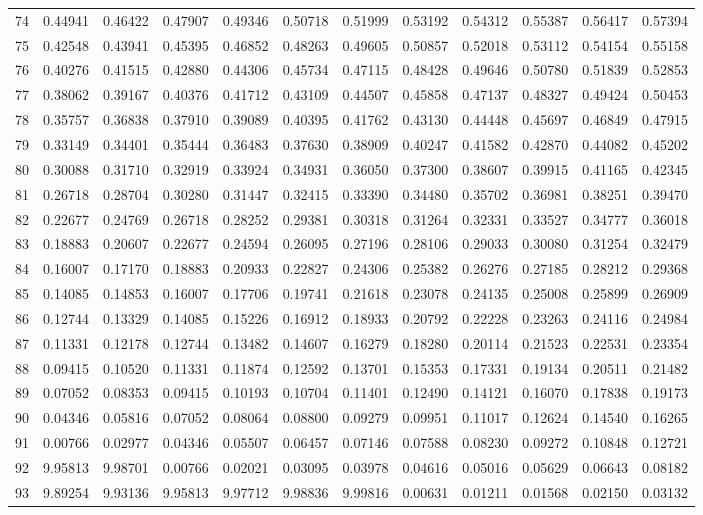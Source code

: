 \begin{center}
\begin{tabular}{|r|rrrrrrrrrrr|}
74&0.44941&0.46422&0.47907&0.49346&0.50718&0.51999&0.53192&0.54312&0.55387&0.56417&0.57394\\[5pt]
75&0.42548&0.43941&0.45395&0.46852&0.48263&0.49605&0.50857&0.52018&0.53112&0.54154&0.55158\\
76&0.40276&0.41515&0.42880&0.44306&0.45734&0.47115&0.48428&0.49646&0.50780&0.51839&0.52853\\
77&0.38062&0.39167&0.40376&0.41712&0.43109&0.44507&0.45858&0.47137&0.48327&0.49424&0.50453\\
78&0.35757&0.36838&0.37910&0.39089&0.40395&0.41762&0.43130&0.44448&0.45697&0.46849&0.47915\\
79&0.33149&0.34401&0.35444&0.36483&0.37630&0.38909&0.40247&0.41582&0.42870&0.44082&0.45202\\[5pt]
80&0.30088&0.31710&0.32919&0.33924&0.34931&0.36050&0.37300&0.38607&0.39915&0.41165&0.42345\\
81&0.26718&0.28704&0.30280&0.31447&0.32415&0.33390&0.34480&0.35702&0.36981&0.38251&0.39470\\
82&0.22677&0.24769&0.26718&0.28252&0.29381&0.30318&0.31264&0.32331&0.33527&0.34777&0.36018\\
83&0.18883&0.20607&0.22677&0.24594&0.26095&0.27196&0.28106&0.29033&0.30080&0.31254&0.32479\\
84&0.16007&0.17170&0.18883&0.20933&0.22827&0.24306&0.25382&0.26276&0.27185&0.28212&0.29368\\[5pt]
85&0.14085&0.14853&0.16007&0.17706&0.19741&0.21618&0.23078&0.24135&0.25008&0.25899&0.26909\\
86&0.12744&0.13329&0.14085&0.15226&0.16912&0.18933&0.20792&0.22228&0.23263&0.24116&0.24984\\
87&0.11331&0.12178&0.12744&0.13482&0.14607&0.16279&0.18280&0.20114&0.21523&0.22531&0.23354\\
88&0.09415&0.10520&0.11331&0.11874&0.12592&0.13701&0.15353&0.17331&0.19134&0.20511&0.21482\\
89&0.07052&0.08353&0.09415&0.10193&0.10704&0.11401&0.12490&0.14121&0.16070&0.17838&0.19173\\[5pt]
90&0.04346&0.05816&0.07052&0.08064&0.08800&0.09279&0.09951&0.11017&0.12624&0.14540&0.16265\\
91&0.00766&0.02977&0.04346&0.05507&0.06457&0.07146&0.07588&0.08230&0.09272&0.10848&0.12721\\
92&9.95813&9.98701&0.00766&0.02021&0.03095&0.03978&0.04616&0.05016&0.05629&0.06643&0.08182\\
93&9.89254&9.93136&9.95813&9.97712&9.98836&9.99816&0.00631&0.01211&0.01568&0.02150&0.03132\\

\end{tabular}
\end{center}
